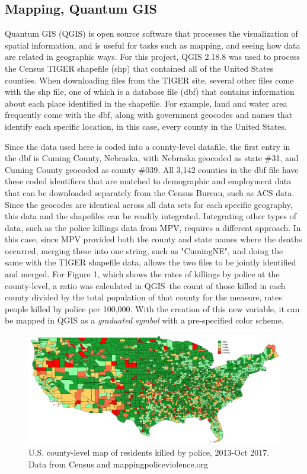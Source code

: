\documentclass[sigconf]{acmart}
\begin{document}
\subsection{Mapping, Quantum GIS}
Quantum GIS (QGIS) is open source software that processes the visualization of spatial information, and is useful for tasks such as mapping, and seeing how data are related in geographic ways. \cite{qgis} For this project, QGIS 2.18.8 was used to process the Census TIGER shapefile (shp) that contained all of the United States counties.  When downloading files from the TIGER site, several other files come with the shp file, one of which is a database file (dbf) that contains information about each place identified in the shapefile.  For example, land and water area frequently come with the dbf, along with government geocodes and names that identify each specific location, in this case, every county in the United States. 

Since the data used here is coded into a county-level datafile, the first entry in the dbf is Cuming County, Nebraska, with Nebraska geocoded as state \#31, and Cuming County geocoded as county \#039.  All 3,142 counties in the dbf file have these coded identifiers that are matched to demographic and employment data that can be downloaded separately from the Census Bureau, such as ACS data.  Since the geocodes are identical across all data sets for each specific geography, this data and the shapefiles can be readily integrated.  Integrating other types of data, such as the police killings data from MPV, requires a different approach.  In this case, since MPV provided both the county and state names where the deaths occurred, merging these into one string, such as "CumingNE", and doing the same with the TIGER shapefile data, allows the two files to be jointly identified and merged.  For Figure 1, which shows the rates of killings by police at the county-level, a ratio was calculated in QGIS--the count of those killed in each county divided by the total population of that county for the measure, rates people killed by police per 100,000.  With the creation of this new variable, it can be mapped in QGIS as a {\em graduated symbol} with a pre-specified color scheme. 

\begin{figure}
\includegraphics[width=1.0\textwidth]{images/figure1.jpg}
\caption{U.S. county-level map of residents killed by police, 2013-Oct 2017.  Data from Census and mappingpoliceviolence.org}
\end{figure}
\end{document}
